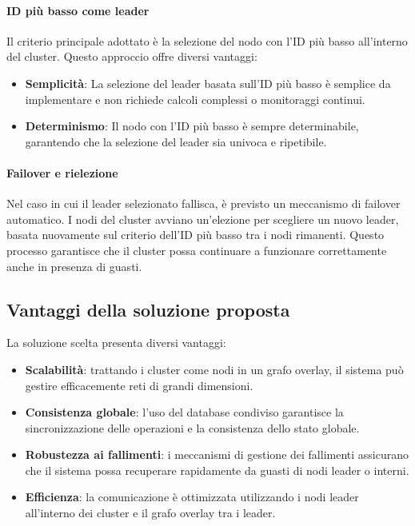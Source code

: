 \documentclass[12pt, a4paper]{report}
\begin{document}
\paragraph{ID pi\`u basso come leader}
Il criterio principale adottato \`e la selezione del nodo con l'ID pi\`u basso all'interno del cluster. Questo approccio offre diversi vantaggi:
\begin{itemize}
    \item \textbf{Semplicit\`a}: La selezione del leader basata sull'ID pi\`u basso \`e semplice da implementare e non richiede calcoli complessi o monitoraggi continui.
    \item \textbf{Determinismo}: Il nodo con l'ID pi\`u basso \`e sempre determinabile, garantendo che la selezione del leader sia univoca e ripetibile.
\end{itemize}

\paragraph{Failover e rielezione}
Nel caso in cui il leader selezionato fallisca, \`e previsto un meccanismo di failover automatico. I nodi del cluster avviano un'elezione per scegliere un nuovo leader, basata nuovamente sul criterio dell'ID pi\`u basso tra i nodi rimanenti. Questo processo garantisce che il cluster possa continuare a funzionare correttamente anche in presenza di guasti.

\newpage
\subsection{Vantaggi della soluzione proposta}

La soluzione scelta presenta diversi vantaggi:

\begin{itemize}
    \item \textbf{Scalabilit\`a}: trattando i cluster come nodi in un grafo overlay, il sistema pu\`o gestire efficacemente reti di grandi dimensioni.
    \item \textbf{Consistenza globale}: l'uso del database condiviso garantisce la sincronizzazione delle operazioni e la consistenza dello stato globale.
    \item \textbf{Robustezza ai fallimenti}: i meccanismi di gestione dei fallimenti assicurano che il sistema possa recuperare rapidamente da guasti di nodi leader o interni.
    \item \textbf{Efficienza}: la comunicazione \`e ottimizzata utilizzando i nodi leader all'interno dei cluster e il grafo overlay tra i leader.
\end{itemize}
\end{document}
